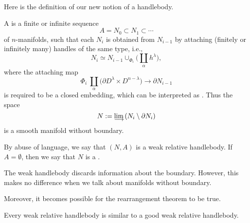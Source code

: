 Here is the definition of our new notion of a handlebody.

\begin{definition}
    A  is a finite or infinite sequence 
    \[ A=N_0\subset N_1\subset\cdots \]
    of $n$-manifolds,
    such that each $N_i$ is obtained from $N_{i-1}$ by attaching
    (finitely or infinitely many) handles of the same type, i.e.,
    \[ N_i \simeq N_{i-1} \cup_{\Phi_i} \biggl(\coprod_\alpha h^\lambda\biggr), \]
    where the attaching map
    \[ \Phi_i \: \coprod_\alpha {} \bigl( \partial D^\lambda\times D^{n-\lambda} \bigr) \to \partial N_{i-1} \]
    is required to be a closed embedding,
    which can be interpreted as .
    Thus the space 
    \[ N:=\limdct{}(N_i\setminus\partial N_i) \]
    is a smooth manifold without boundary.
\end{definition}

By abuse of language, we say that $(N,A)$ is a weak relative handlebody.
If $A=\emptyset$, then we say that $N$ is a .

The weak handlebody discards information about the boundary.
However, this makes no difference when we talk about manifolds without boundary.

Moreover, it becomes possible for the 
rearrangement theorem to be true.

\begin{theorem}[Rearrangement] \label{thm-rearrange-weak}
Every weak relative handlebody
is similar to a good weak relative handlebody.
\end{theorem}

